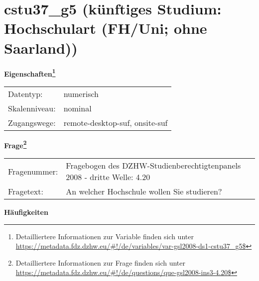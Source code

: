 
    \setcounter{footnote}{0}

    \vspace*{-1.8cm}
	\section{cstu37\_g5 (künftiges Studium: Hochschulart (FH/Uni; ohne Saarland))}
	\label{section:cstu37_g5}



    \vspace*{0.5cm}
    \noindent\textbf{Eigenschaften\footnote{Detailliertere Informationen zur Variable finden sich unter
		\url{https://metadata.fdz.dzhw.eu/\#!/de/variables/var-gsl2008-ds1-cstu37_g5$}}}\\
	\begin{tabularx}{\hsize}{@{}lX}
	Datentyp: & numerisch \\
	Skalenniveau: & nominal \\
	Zugangswege: &
	  remote-desktop-suf, 
	  onsite-suf
 \\
    \end{tabularx}



				\vspace*{0.5cm}
                \noindent\textbf{Frage\footnote{Detailliertere Informationen zur Frage finden sich unter
		              \url{https://metadata.fdz.dzhw.eu/\#!/de/questions/que-gsl2008-ins3-4.20$}}}\\
				\begin{tabularx}{\hsize}{@{}lX}
					Fragenummer: &
					  Fragebogen des DZHW-Studienberechtigtenpanels 2008 - dritte Welle:
					  4.20
 \\
					Fragetext: & An welcher Hochschule wollen Sie studieren? \\
				\end{tabularx}





        		\vspace*{0.5cm}
                \noindent\textbf{Häufigkeiten}

